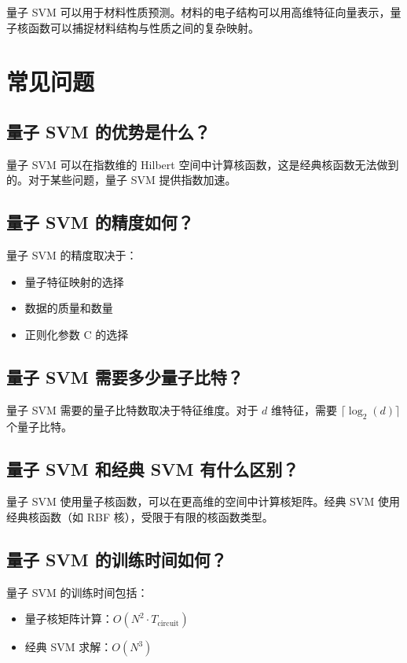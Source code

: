 \documentclass[12pt,a4paper]{article}
\begin{document}
量子 SVM 可以用于材料性质预测。材料的电子结构可以用高维特征向量表示，量子核函数可以捕捉材料结构与性质之间的复杂映射。

\section{常见问题}

\subsection{量子 SVM 的优势是什么？}

量子 SVM 可以在指数维的 Hilbert 空间中计算核函数，这是经典核函数无法做到的。对于某些问题，量子 SVM 提供指数加速。

\subsection{量子 SVM 的精度如何？}

量子 SVM 的精度取决于：
\begin{itemize}
  \item 量子特征映射的选择
  \item 数据的质量和数量
  \item 正则化参数 C 的选择
\end{itemize}

\subsection{量子 SVM 需要多少量子比特？}

量子 SVM 需要的量子比特数取决于特征维度。对于 $d$ 维特征，需要 $\lceil \log_2(d) \rceil$ 个量子比特。

\subsection{量子 SVM 和经典 SVM 有什么区别？}

量子 SVM 使用量子核函数，可以在更高维的空间中计算核矩阵。经典 SVM 使用经典核函数（如 RBF 核），受限于有限的核函数类型。

\subsection{量子 SVM 的训练时间如何？}

量子 SVM 的训练时间包括：
\begin{itemize}
  \item 量子核矩阵计算：$O(N^2 \cdot T_{\text{circuit}})$
  \item 经典 SVM 求解：$O(N^3)$
\end{itemize}
\end{document}
